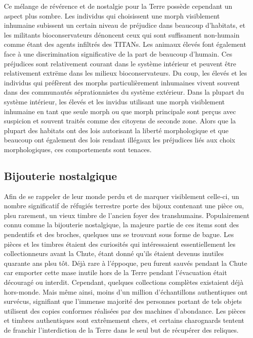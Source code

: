 Ce mélange de révérence et de nostalgie pour la Terre possède cependant un aspect plus sombre. Les individus qui choisissent une morph visiblement inhumaine subissent un certain niveau de préjudice dans beaucoup d'habitats, et les militants bioconservateurs dénoncent ceux qui sont suffisament non-humain comme étant des agents infiltrés des TITANs. Les animaux élevés font également face à une discrimination significative de la part de beaucoup d'humain. Ces préjudices sont relativement courant dans le système intérieur et peuvent être relativement extrëme dans les milieux bioconservateurs. Du coup, les élevés et les individus qui préfèrent des morphs particulièrement inhumaines vivent souvent dans des communautés séprationnistes du système extérieur. Dans la plupart du système intérieur, les élevés et les invidus utilisant une morph visiblement inhumaine en tant que seule morph ou que morph principale sont perçus avec suspicion et souvent traités comme des citoyens de seconde zone. Alors que la plupart des habitats ont des lois autorisant la liberté morphologique et que beaucoup ont également des lois rendant illégaux les  préjudices liés aux choix morphologiques, ces comportements sont tenaces. 

\subsection{Bijouterie nostalgique} \label{sec:nostalgia-jewelry} 

Afin de se rappeler de leur monde perdu et de marquer visiblement celle-ci, un nombre significatif de réfugiés terrestre porte des bijoux contenant une pièce ou, plsu rarement, un vieux timbre de l'ancien foyer des transhumains. Populairement connu comme la bijouterie nostalgique, la majeure partie de ces items sont des pendentifs et des broches, quelques uns se trouvant sous forme de bague. Les pièces et les timbres étaient des curiosités qui intéressaient essentiellement les collectionneurs avant la Chute, étant donné qu'ils étaient devenus inutiles quarante ans plsu tôt. Déjà rare à l'éppoque, peu furent sauvés pendant la Chute car emporter cette mase inutile hors de la Terre pendant l'évacuation était découragé ou interdit. Cependant, quelques collections complètes existaient déjà hors-monde. Mais même ainsi, moins d'un million d'échantillons authentiques ont survécus, signifiant que l'immense majorité des personnes portant de tels objets utilisent des copies conformes réalisées par des machines d'abondance. Les pièces et timbres authentiques sont extrêmement chers, et certains charognards tentent de franchir l'interdiction de la Terre dans le seul but de récupérer des reliques. 

